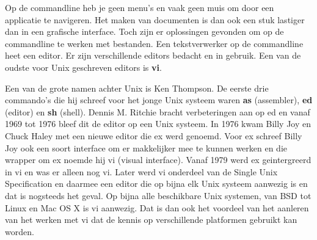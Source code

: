 Op de commandline heb je geen menu's en vaak geen muis om door een applicatie te navigeren. Het maken van documenten is dan ook een stuk lastiger dan in een grafische interface. Toch zijn er oplossingen gevonden om op de commandline te werken met bestanden. Een tekstverwerker op de commandline heet een editor. Er zijn verschillende editors bedacht en in gebruik. Een van de oudste voor Unix geschreven editors is \textbf{vi}.

Een van de grote namen achter Unix is Ken Thompson. De eerste drie commando's die hij schreef voor het jonge Unix systeem waren \textbf{as} (assembler), \textbf{ed} (editor) en \textbf{sh} (shell). Dennis M. Ritchie bracht verbeteringen aan op ed en vanaf 1969 tot 1976 bleef dit de editor op een Unix systeem. In 1976 kwam Billy Joy en Chuck Haley met een nieuwe editor die ex werd genoemd. Voor ex schreef Billy Joy ook een soort interface om er makkelijker mee te kunnen werken en die wrapper om ex noemde hij vi (visual interface). Vanaf 1979 werd ex geintergreerd in vi en was er alleen nog vi. Later werd vi onderdeel van de Single Unix Specification en daarmee een editor die op bijna elk Unix systeem aanwezig is en dat is nogsteeds het geval. Op bijna alle beschikbare Unix systemen, van BSD tot Linux en Mac OS X is vi aanwezig. Dat is dan ook het voordeel van het aanleren van het werken met vi dat de kennis op verschillende platformen gebruikt kan worden.
